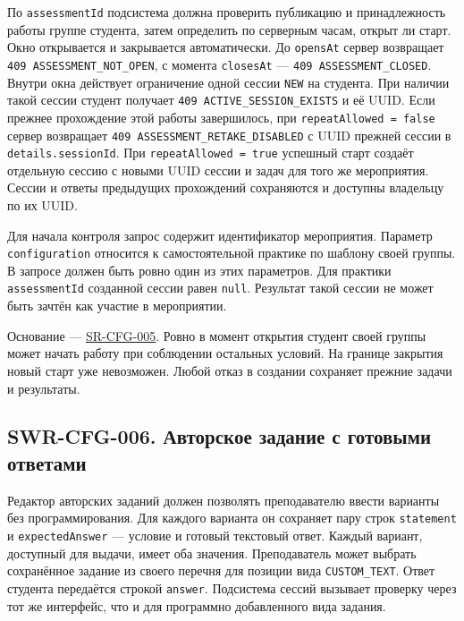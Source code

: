 \documentclass[12pt,a4paper]{article}
\begin{document}
По \texttt{assessment\allowbreak{}Id} подсистема должна проверить публикацию и принадлежность работы группе студента, затем определить по серверным часам, открыт ли старт. Окно открывается и закрывается автоматически. До \texttt{opensAt} сервер возвращает \texttt{409 ASSESSMENT\_\allowbreak{}NOT\_\allowbreak{}OPEN}, с момента \texttt{closesAt} --- \texttt{409 ASSESSMENT\_\allowbreak{}CLOSED}. Внутри окна действует ограничение одной сессии \texttt{NEW} на студента. При наличии такой сессии студент получает \texttt{409 ACTIVE\_\allowbreak{}SESSION\_\allowbreak{}EXISTS} и её UUID. Если прежнее прохождение этой работы завершилось, при \texttt{repeat\allowbreak{}Allowed =\allowbreak{} false} сервер возвращает \texttt{409 ASSESSMENT\_\allowbreak{}RETAKE\_\allowbreak{}DISABLED} с UUID прежней сессии в \texttt{details.\allowbreak{}session\allowbreak{}Id}. При \texttt{repeat\allowbreak{}Allowed =\allowbreak{} true} успешный старт создаёт отдельную сессию с новыми UUID сессии и задач для того же мероприятия. Сессии и ответы предыдущих прохождений сохраняются и доступны владельцу по их UUID.

Для начала контроля запрос содержит идентификатор мероприятия. Параметр \texttt{configuration} относится к самостоятельной практике по шаблону своей группы. В запросе должен быть ровно один из этих параметров. Для практики \texttt{assessment\allowbreak{}Id} созданной сессии равен \texttt{null}. Результат такой сессии не может быть зачтён как участие в мероприятии.

Основание --- {\href{../04\_Системные\_требования/DOC-05\_Системные\_требования.pdf\#sr-cfg-005}{SR-CFG-005}}. Ровно в момент открытия студент своей группы может начать работу при соблюдении остальных условий. На границе закрытия новый старт уже невозможен. Любой отказ в создании сохраняет прежние задачи и результаты.

\subsection{SWR-CFG-006. Авторское задание с готовыми ответами}\label{swr-cfg-006-ux430ux432ux442ux43eux440ux441ux43aux43eux435-ux437ux430ux434ux430ux43dux438ux435-ux441-ux433ux43eux442ux43eux432ux44bux43cux438-ux43eux442ux432ux435ux442ux430ux43cux438}

\hypertarget{swr-cfg-006-авторское-задание-с-готовыми-ответами}{}

\hypertarget{swr-cfg-006}{}

Редактор авторских заданий должен позволять преподавателю ввести варианты без программирования. Для каждого варианта он сохраняет пару строк \texttt{statement} и \texttt{expected\allowbreak{}Answer} --- условие и готовый текстовый ответ. Каждый вариант, доступный для выдачи, имеет оба значения. Преподаватель может выбрать сохранённое задание из своего перечня для позиции вида \texttt{CUSTOM\_\allowbreak{}TEXT}. Ответ студента передаётся строкой \texttt{answer}. Подсистема сессий вызывает проверку через тот же интерфейс, что и для программно добавленного вида задания.
\end{document}
